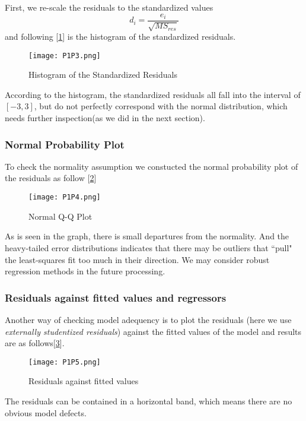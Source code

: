 \documentclass[11pt]{article}
\begin{document}
First, we re-scale the residuals to the standardized values 
$$d_i=\frac {e_i}{\sqrt{MS_{res}}}$$ and following [\ref{Fig3}] is the histogram of the standardized residuals.


\begin{figure}[!htb]
\centering
\texttt{[image: P1P3.png]}
\caption{Histogram of the Standardized Residuals}\label{Fig3}
\end{figure}


According to the histogram, the standardized residuals all fall into the interval of $[-3,3]$, but do not perfectly correspond with the normal distribution, which needs further inspection(as we did in the next section).



\subsubsection{Normal Probability Plot}

To check the normality assumption we constucted the normal probability plot of the residuals as follow [\ref{Fig4}]

\begin{figure}[!htb]
\centering
\texttt{[image: P1P4.png]}
\caption{Normal Q-Q Plot}\label{Fig4}
\end{figure}

As is seen in the graph, there is small departures from the normality. And the heavy-tailed error distributions indicates that there may be outliers that “pull" the least-squares fit too much in their direction. We may consider robust regression methods in the future processing.
\subsubsection{Residuals against fitted values and regressors}

Another way of checking model adequency is to plot the residuals (here we use {\it externally studentized residuals}) against the fitted values of the model and results are as follows[\ref{Fig5}]. 

\begin{figure}[!htb]
\centering
\texttt{[image: P1P5.png]}
\caption{Residuals against fitted values}\label{Fig5}
\end{figure}

The residuals can be contained in a horizontal band, which means there are no obvious model defects.
\end{document}

